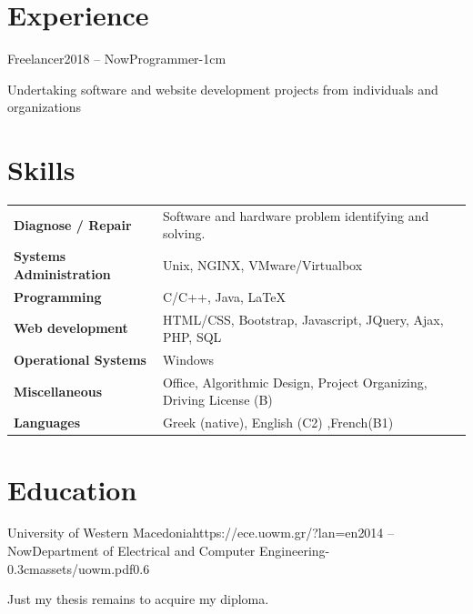 \documentclass{mycv}
\begin{document}
	\section{Experience}

	\begin{EntryDated}{Freelancer}{}{2018 -- Now}{Programmer}{-1cm}
	\begin{Itemize}
		\item Undertaking software and website development projects from individuals and organizations
	\end{Itemize}
	\end{EntryDated}

	\section{Skills}
	\begin{tabular}{m{4.5cm} m{13cm}}
		\textbf{Diagnose / Repair}     & Software and hardware problem identifying and solving. \\
		\textbf{Systems Administration}& Unix, NGINX, VMware/Virtualbox \\
		\textbf{Programming} 	 	   & C/C++, Java, \LaTeX \\
		\textbf{Web development}	   & HTML/CSS, Bootstrap, Javascript, JQuery, Ajax, PHP, SQL \\
		\textbf{Operational Systems}   & Windows \\
		\textbf{Miscellaneous}         & Office, Algorithmic Design, Project Organizing, Driving License (B) \\
		\textbf{Languages} 			   & Greek (native), English (C2) ,French(B1)
	\end{tabular}

	\section{Education}

	\begin{EntryDatedLogo}{University of Western Macedonia}{https://ece.uowm.gr/?lan=en}{2014 -- Now}{Department of Electrical and Computer Engineering}{-0.3cm}{assets/uowm.pdf}{0.6}
	\begin{Itemize}
		\item Just my thesis remains to acquire my diploma.
	\end{Itemize}
	\end{EntryDatedLogo}
\end{document}
